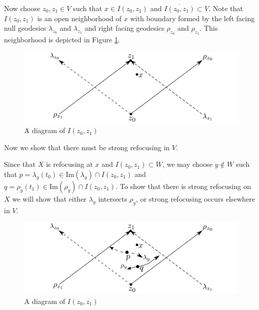 Now choose $z_0, z_1 \in V$ such that $x\in I(z_0, z_1)$ and $\overline{I(z_0, z_1)} \subset V$.  Note that $I(z_0, z_1)$ is an open neighborhood of $x$ with boundary formed by the left facing null geodesics $\lambda_{z_0}$ and $\lambda_{z_1}$ and right facing geodesics $\rho_{z_0}$ and $\rho_{z_1}$.  This neighborhood is depicted in Figure  \ref{figure1.fig}.

\begin{figure}[htbp]
	\centering
	\includegraphics[width=12cm]{simpleRefocussingNbhd}
	\caption{A diagram of $I(z_0, z_1)$}
	\label{figure1.fig}
\end{figure}

Now we show that there must be strong refocusing in $V$.

Since that $X$ is refocusing at $x$ and $I(z_0, z_1)\subset W$, we may choose $y\notin W$ such that $p = \lambda_y (t_0) \in \mbox{Im}(\lambda_y) \cap I(z_0, z_1)$ and $q = \rho_y (t_1) \in \mbox{Im}(\rho_y) \cap I(z_0, z_1)$.  To show that there is strong refocusing on $X$ we will show that either $\lambda_y$ intersects $\rho_y$, or strong refocusing occurs elsewhere in $V$.  

 

\begin{figure}[hbtp]
	\centering
	\includegraphics[width=12cm]{refocussingNbhd}
	\caption{A diagram of $I(z_0, z_1)$}
	\label{figure2.fig}
\end{figure}

